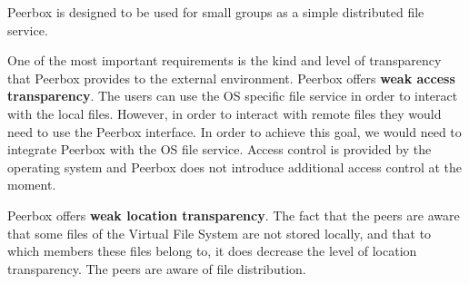 
Peerbox is designed to be used for small groups as a simple distributed file service.

%


One of the most important requirements is the kind and level of transparency that Peerbox provides to the external environment. Peerbox offers \textbf{weak access transparency}. The users can use the OS specific file service in order to interact with the local files. However, in order to interact with remote files they would need to use the Peerbox interface. In order to achieve this goal, we would need to integrate Peerbox with the OS file service.  Access control is provided by the operating system and Peerbox does not introduce additional access control at the moment.

Peerbox offers \textbf{weak location transparency}. The fact that the peers are aware that some files of the Virtual File System are not stored locally, and that to which members these files belong to, it does decrease the level of location transparency. The peers are aware of file distribution.









% 




